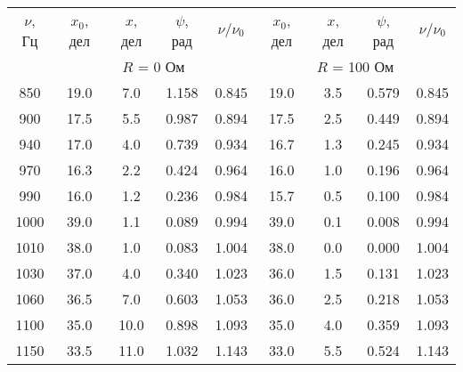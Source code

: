 \begin{tabular}{c|cccc|cccc}
\toprule
$\nu$, Гц & $x_0$, дел & $x$, дел & $\psi$, рад &  $\nu/\nu_0$ 
          & $x_0$, дел & $x$, дел & $\psi$, рад &  $\nu/\nu_0$\\

 & \multicolumn{4}{c}{$R$ = 0 Ом} & \multicolumn{4}{c}{$R$ = 100 Ом} \\

850  & 19.0 & 7.0  & 1.158 & 0.845 & 19.0 & 3.5 & 0.579 & 0.845 \\
900  & 17.5 & 5.5  & 0.987 & 0.894 & 17.5 & 2.5 & 0.449 & 0.894 \\
940  & 17.0 & 4.0  & 0.739 & 0.934 & 16.7 & 1.3 & 0.245 & 0.934 \\
970  & 16.3 & 2.2  & 0.424 & 0.964 & 16.0 & 1.0 & 0.196 & 0.964 \\
990  & 16.0 & 1.2  & 0.236 & 0.984 & 15.7 & 0.5 & 0.100 & 0.984 \\
1000 & 39.0 & 1.1  & 0.089 & 0.994 & 39.0 & 0.1 & 0.008 & 0.994 \\
1010 & 38.0 & 1.0  & 0.083 & 1.004 & 38.0 & 0.0 & 0.000 & 1.004 \\
1030 & 37.0 & 4.0  & 0.340 & 1.023 & 36.0 & 1.5 & 0.131 & 1.023 \\
1060 & 36.5 & 7.0  & 0.603 & 1.053 & 36.0 & 2.5 & 0.218 & 1.053 \\
1100 & 35.0 & 10.0 & 0.898 & 1.093 & 35.0 & 4.0 & 0.359 & 1.093 \\
1150 & 33.5 & 11.0 & 1.032 & 1.143 & 33.0 & 5.5 & 0.524 & 1.143 \\
\bottomrule
\end{tabular}
